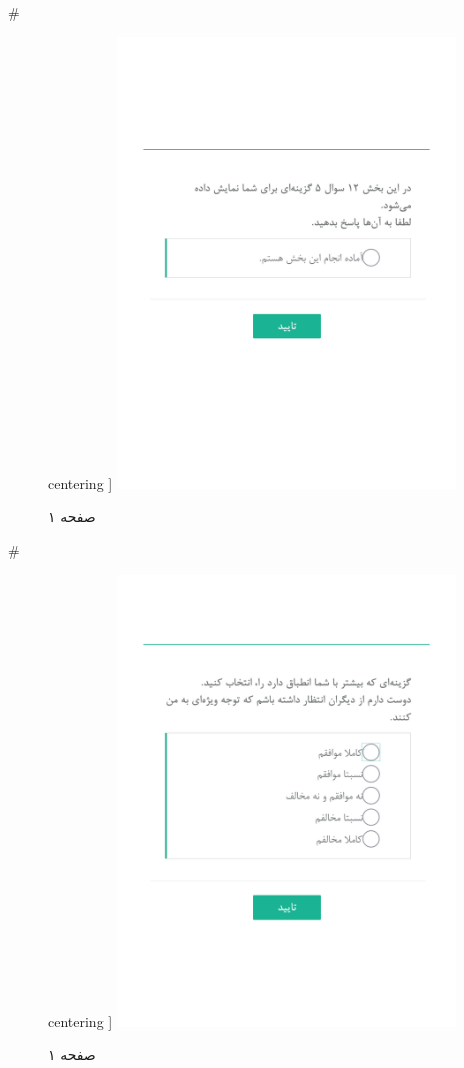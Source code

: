{ 
 # 
\begin{figure}[htpb]
centering ]
\includegraphics[width=0.8\textwidth]{./img/Task23.png/}
\caption{صفحه ۱}
\label{fig:Task1}
\end{figure}
 
 
 # 
\begin{figure}[htpb]
centering ]
\includegraphics[width=0.8\textwidth]{./img/Task24.png/}
\caption{صفحه ۱}
\label{fig:Task1}
\end{figure}
 
}
